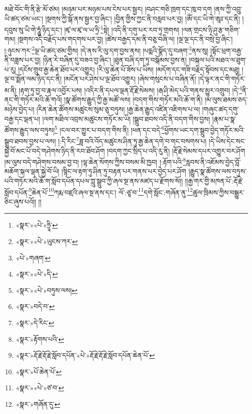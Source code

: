 མཐེ་བོང་གི་ནི་རྩེ་མོ་ཙམ། །མཉམ་པར་མཉམ་པས་ངེས་པར་སྦྱར། །བཤང་གཅི་ཁྲག་དང་ཁུ་བ་དག །ནས་ཀྱི་འབྲུ་ཡི་ཚད་ཙམ་ཡང་། །སྔགས་ཀྱི་སྒོ་ནས་སྦྱར་བྱ་ཞིང་། །བྱིན་གྱིས་ཀྱང་ནི་བརླབ་པར་བྱ། །ཨོཾ་དང་ཡི་གེ་ཨཱཿ་དང་ནི། །དབུས་སུ་ཡི་གེ་ཧཱུཾ་ཉིད་དང་། །ཛྭ་ལ་ཛྭ་ལ་ཡ་ཧྲི་\footnote{«སྣར་»«པེ་»ཧྲཱི་}སྟེ། །འདི་ནི་དགུ་པར་རབ་ཏུ་གྲགས། །ལན་གྲངས་ཉི་ཤུ་རྩ་གཅིག་གམ། །སྔགས་འདི་བརྗོད་པས་གདགས་པར་བྱ། །ཚེས་བརྒྱད་དམ་ནི་བཅུ་བཞི་ལ། །ལྔ་ལྔ་དང་ནི་བསྲེ་བྱ་ཞིང་། །:ཉུངས་ཀར་\footnote{«སྣར་»«པེ་»ཡུངས་ཀར་}ལྔ་ཡི་ཚད་ཙམ་གྱིས། །དེ་ནས་རི་ལུ་དག་བྱས་ནས། །པདྨའི་སྣོད་དུ་བཞག་\footnote{«པེ་»གཞག་}ནས་སུ། །སྟོང་ཕྲག་བརྒྱ་ནི་བཟླས་པར་བྱ། །ཉིན་རེ་བཞིན་དུ་བཟའ་བྱ་ཞིང་། །ཐུན་བཞི་དག་ཏུ་བསྒོམས་བྱས་ན། །བསྐལ་པའི་མཐའ་ལ་ཐུག་པ་རུ། །དངོས་གྲུབ་རྒྱ་ཆེན་ཐོབ་པར་འགྱུར། །རི་ལུ་ཆེན་པོ་ཟོས་པ་ཡིས། །མདོག་དང་གཟི་བརྗིད་སྟོབས་དང་མཐུ། །ལྔ་བ་སྨོན་ལམ་ཉིད་དང་ནི། །མངོན་པར་ཤེས་པ་ལྔ་ཐོབ་འགྱུར། །ཞེས་གསུངས་པ་བཞིན་ནོ། །དེ་ལྟར་ནང་གི་གཏོར་མ་ནི། །རྟག་ཏུ་བྱ་བ་རྣལ་འབྱོར་པས། །འདིར་ནི་དཔལ་ལྡན་རྡོ་རྗེ་སེམས། །རྒ་ཤི་མེད་པའི་གནས་མྱུར་འགྲུབ། །དེ་\footnote{«སྣར་»«པེ་»དི་}ནི་ནང་གི་གཏོར་མའི་ཆོ་གའོ། །སྣ་ཚོགས་རྒྱུད་ཀྱི་རྒྱ་མཚོ་ལས། །བདག་གིས་གཏོར་མའི་ཆོ་ག་ནི། །མ་ལུས་ཐམས་ཅད་མཉེས་བྱེད་པ། །རིན་ཆེན་ཚོགས་མཚུངས་སུམ་ཅུ་བཏུས། །རྒྱ་ཆེན་རྒྱུད་འཛིན་འཇིགས་པ་ལ། །གཞུང་ཚད་དགུ་བརྒྱ་དང་ལྡན་པ། །ལག་མཐིལ་འབྲས་མཚུངས་གཏོར་མ་ཡི། །སྒྲུབ་ཐབས་འདི་ནི་བདག་གིས་བྱས། །རྣམ་པ་སྣ་ཚོགས་རྒྱུད་ལས་བཏུས།\footnote{«སྣར་»«པེ་»བཏུས་ལས།} །ངལ་བར་གྱུར་པ་བདག་གིས་ནི། །ཕན་དང་བདེ་\footnote{«སྣར་»བདེ་བ་}ཕྱོགས་ཡང་དག་སྒྲུབ་བྱེད་གཏོར་མའི་སྒྲུབ་ཐབས་བྱས་པ་ལས། །:དི་རིང་\footnote{«སྣར་»དེ་རིང་}ཟླ་བའི་འོད་མཚུངས་ཤིན་ཏུ་རྒྱ་ཆེན་དགེ་བ་གང་བསགས་པ། །དེ་ཡིས་དེང་སང་སྐྱེ་བོ་མང་པོ་བདེ་གཤེགས་ཉིད་ནི་རབ་ཐོབ་ཤོག །བདག་ཀྱང་སྲིད་པ་འདི་རུ་ནི། །རྡོ་རྗེ་སེམས་དཔར་འགྱུར་བར་ཤོག །མ་ལུས་བདེ་གཤེགས་བསམ་བྱ་བ། །ལྷ་ཆེན་སོགས་ཀྱིས་བསམ་མི་ཁྱབ། །:རྟོག་པའི་\footnote{«སྣར་»རྟོགས་པའི་}རླབས་ནི་འཇོམས་བྱེད་བློ་མཆོག་སྐལ་ལྡན་སྐྱེ་བོ་ཡི། །སྙིང་ལ་རྟག་ཏུ་ཤིན་ཏུ་བརྟན་པར་གནས་པར་བྱེད་པར་ཤོག །རྒྱུད་སྣ་ཚོགས་ལས་བཏུས་པའི་གཏོར་མའི་ཆོ་ག་སློབ་དཔོན་དཔལ་ཀླུ་སྒྲུབ་ཀྱི་ཞལ་སྔ་ནས་མཛད་པ་རྫོགས་སོ།། །།རྒྱ་གར་གྱི་མཁན་པོ་:རྡོ་རྗེ་སློབ་དཔོན་\footnote{«སྣར་»རྡོ་རྗེ་རྡོ་རྗེ་སློབ་དཔོན་«པེ་»རྡོ་རྗེ་རྡོ་རྗེ་སློབ་དཔོན་ཆེན་པོ་}ཆེན་པོ་\footnote{«སྣར་»པོ་ཆེན་པོ་}ཀརྨ་བཛྲའི་ཞལ་སྔ་ནས་དང་། ལོ་:ཙཱ་བ་\footnote{«སྣར་»«པེ་»ཙ་བ་}དགེ་སློང་:གཞོན་ནུ་\footnote{«སྣར་»གཞོན་དུ་}ཚུལ་ཁྲིམས་ཀྱིས་བསྒྱུར་ཅིང་ཞུས་པའོ།། །།